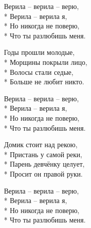 \begin{minipage}{\linewidth}
\hspace*{1.5em}Верила – верила – верю,\\*
\hspace*{1.5em}Верила – верила я,\\*
\hspace*{1.5em}Но никогда не поверю,\\*
\hspace*{1.5em}Что ты разлюбишь меня.\\
\end{minipage}\par\medskip\nobreak

\medskip

\begin{minipage}{\linewidth}
Годы прошли молодые,\\*
Морщины покрыли лицо,\\*
Волосы стали седые,\\*
Больше не любит никто.\\
\end{minipage}\par\medskip\nobreak

\medskip

\begin{minipage}{\linewidth}
\hspace*{1.5em}Верила – верила – верю,\\*
\hspace*{1.5em}Верила – верила я,\\*
\hspace*{1.5em}Но никогда не поверю,\\*
\hspace*{1.5em}Что ты разлюбишь меня.\\
\end{minipage}\par\medskip\nobreak

\medskip

\begin{minipage}{\linewidth}
Домик стоит над рекою,\\*
Пристань у самой реки,\\*
Парень девчёнку целует,\\*
Просит он правой руки.\\
\end{minipage}\par\medskip\nobreak

\medskip

\begin{minipage}{\linewidth}
\hspace*{1.5em}Верила – верила – верю,\\*
\hspace*{1.5em}Верила – верила я,\\*
\hspace*{1.5em}Но никогда не поверю,\\*
\hspace*{1.5em}Что ты разлюбишь меня.\\
\end{minipage}

